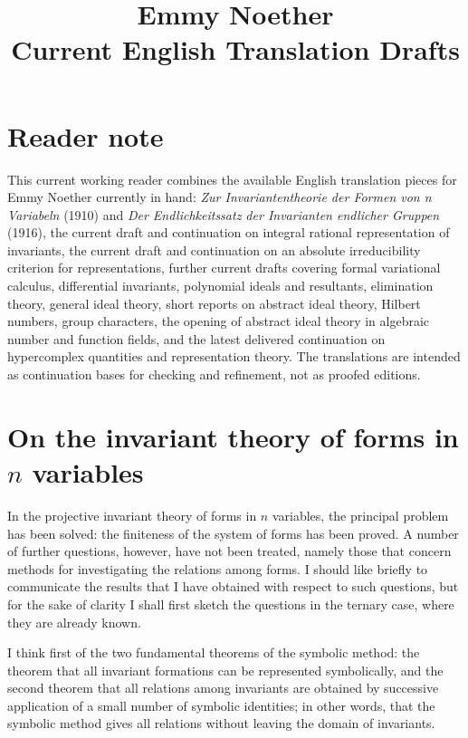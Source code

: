 \documentclass[11pt]{article}
\title{Emmy Noether\\Current English Translation Drafts}
\author{}
\date{}
\begin{document}
\maketitle

\section*{Reader note}
This current working reader combines the available English translation pieces for Emmy Noether currently in hand:
\emph{Zur Invariantentheorie der Formen von n Variabeln} (1910) and
\emph{Der Endlichkeitssatz der Invarianten endlicher Gruppen} (1916), the current draft and continuation on integral rational representation of invariants, the current draft and continuation on an absolute irreducibility criterion for representations, further current drafts covering formal variational calculus, differential invariants, polynomial ideals and resultants, elimination theory, general ideal theory, short reports on abstract ideal theory, Hilbert numbers, group characters, the opening of abstract ideal theory in algebraic number and function fields, and the latest delivered continuation on hypercomplex quantities and representation theory.
The translations are intended as continuation bases for checking and refinement, not as proofed editions.

\section*{On the invariant theory of forms in $n$ variables}

In the projective invariant theory of forms in $n$ variables, the principal problem has been solved: the finiteness of the system of forms has been proved. A number of further questions, however, have not been treated, namely those that concern methods for investigating the relations among forms. I should like briefly to communicate the results that I have obtained with respect to such questions, but for the sake of clarity I shall first sketch the questions in the ternary case, where they are already known.

I think first of the two fundamental theorems of the symbolic method: the theorem that all invariant formations can be represented symbolically, and the second theorem that all relations among invariants are obtained by successive application of a small number of symbolic identities; in other words, that the symbolic method gives all relations without leaving the domain of invariants.
\end{document}
